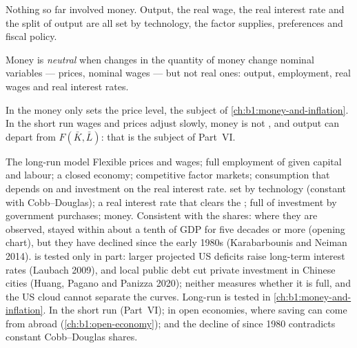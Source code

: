 Nothing so far involved money. Output, the real wage, the real interest
rate and the split of output are all set by technology, the factor
supplies, preferences and fiscal policy.

\begin{definition}\label{def:b1:long-run-model:neutrality}
Money is \emph{neutral} when changes in the quantity of money change
nominal variables --- prices, nominal wages --- but not real ones: output,
employment, real wages and real interest rates.
\end{definition}

In the  money only sets the price level, the subject of
\cref{ch:b1:money-and-inflation}. In the short run wages and prices adjust
slowly, money is not , and output can depart from $F(\bar K, \bar L)$: that
is the subject of Part~VI.

\begin{model}{The long-run model}
\assumes Flexible prices and wages; full employment of given capital and
labour; a closed economy; competitive factor markets; consumption that
depends on  and investment on the real interest rate.
\predicts {} set by technology (constant with Cobb--Douglas); a
real interest rate that clears the ; full 
of investment by government purchases;  money.
\tested Consistent with the shares: where they are observed, 
stayed within about a tenth of GDP for five decades or more (opening
chart), but they have declined since the early 1980s (Karabarbounis and
Neiman 2014). %
 is tested only in part: larger projected US deficits raise
long-term interest rates (Laubach 2009), %
and local public debt cut private investment in Chinese cities (Huang,
Pagano and Panizza 2020); %
neither measures whether it is full, and the US cloud cannot separate the
curves. Long-run  is tested in \cref{ch:b1:money-and-inflation}.
\breaks In the short run (Part~VI); in open economies, where saving can
come from abroad (\cref{ch:b1:open-economy}); and the decline of  since 1980 contradicts constant Cobb--Douglas shares.
\end{model}

